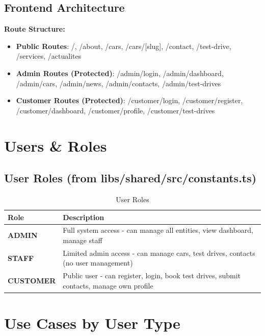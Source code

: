 \documentclass[12pt,a4paper]{article}
\begin{document}
\subsection{Frontend Architecture}

\bigskip
\noindent\textbf{Route Structure:}
\begin{itemize}
    \item \textbf{Public Routes}: /, /about, /cars, /cars/[slug], /contact, /test-drive, /services, /actualites
    \item \textbf{Admin Routes (Protected)}: /admin/login, /admin/dashboard, /admin/cars, /admin/news, /admin/contacts, /admin/test-drives
    \item \textbf{Customer Routes (Protected)}: /customer/login, /customer/register, /customer/dashboard, /customer/profile, /customer/test-drives
\end{itemize}

\newpage

\section{Users \& Roles}
\label{sec:users}

\subsection{User Roles (from libs/shared/src/constants.ts)}

\begin{table}[h]
\centering
\caption{User Roles}
\begin{tabular}{@{}ll@{}}
\toprule
Role & Description \\
\midrule
\textbf{ADMIN} & Full system access - can manage all entities, view dashboard, manage staff \\
\textbf{STAFF} & Limited admin access - can manage cars, test drives, contacts (no user management) \\
\textbf{CUSTOMER} & Public user - can register, login, book test drives, submit contacts, manage own profile \\
\bottomrule
\end{tabular}
\end{table}

\newpage

\section{Use Cases by User Type}
\label{sec:usecases}
\end{document}
